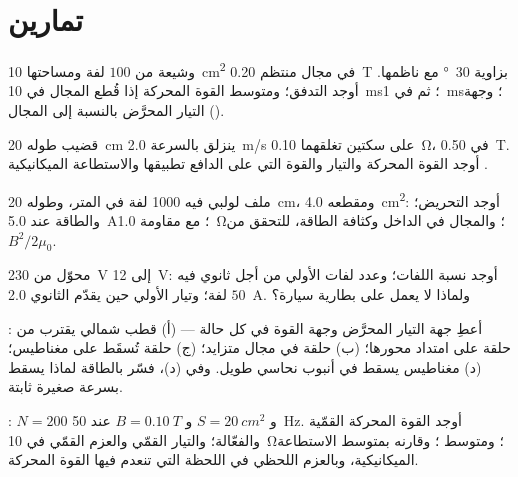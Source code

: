 \section{تمارين}

\begin{exercise}[$\star$]\label{exo:b1:induction:1}
وشيعة من $100$ لفة ومساحتها \qty{10}{cm^2} في مجال منتظم \qty{0.20}{T} بزاوية
\qty{30}{\degree} مع ناظمها. أوجد التدفق؛ ومتوسط القوة المحركة إذا قُطع المجال
في \qty{10}{ms}؛ ثم في \qty{1}{ms}؛ وجهة التيار المحرَّض
بالنسبة إلى المجال ().
\end{exercise}

\begin{exercise}[$\star$]\label{exo:b1:induction:2}
قضيب طوله \qty{20}{cm} ينزلق بالسرعة \qty{2.0}{m/s} على سكتين تغلقهما
\qty{0.10}{\ohm}، في \qty{0.50}{T}. أوجد القوة المحركة والتيار  والقوة
التي على الدافع تطبيقها والاستطاعة الميكانيكية .
\end{exercise}

\begin{exercise}[$\star$]\label{exo:b1:induction:3}
ملف لولبي فيه 1000 لفة في المتر، وطوله \qty{20}{cm}، ومقطعه \qty{4.0}{cm^2}:
أوجد التحريض؛ والطاقة عند \qty{5.0}{A}؛  مع مقاومة \qty{1.0}{\ohm}؛
والمجال في الداخل وكثافة الطاقة، للتحقق من $B^2/2\mu_0$.
\end{exercise}

\begin{exercise}[$\star$]\label{exo:b1:induction:4}
محوّل من \qty{230}{V} إلى \qty{12}{V}: أوجد نسبة اللفات؛ وعدد لفات الأولي
من أجل ثانوي فيه $50$ لفة؛ وتيار الأولي حين يقدّم الثانوي
\qty{2.0}{A}. ولماذا لا يعمل على بطارية سيارة؟
\end{exercise}

\begin{exercise}[$\star\star$]\label{exo:b1:induction:5}
: أعطِ جهة التيار المحرَّض وجهة
القوة في كل حالة --- (أ) قطب شمالي يقترب من حلقة على امتداد
محورها؛ (ب) حلقة في مجال متزايد؛ (ج) حلقة تُسقَط
على مغناطيس؛ (د) مغناطيس يسقط في أنبوب نحاسي طويل. وفي (د)،
فسّر بالطاقة لماذا يسقط بسرعة صغيرة ثابتة.
\end{exercise}

\begin{exercise}[$\star\star$]\label{exo:b1:induction:6}
: $N = 200$ و $S = \qty{20}{cm^2}$ و $B = \qty{0.10}{T}$ عند \qty{50}{Hz}.
أوجد القوة المحركة القمّية والفعّالة؛ والتيار القمّي والعزم القمّي في \qty{10}{\ohm}؛ ومتوسط
؛ وقارنه بمتوسط الاستطاعة الميكانيكية، وبالعزم
اللحظي في اللحظة التي تنعدم فيها القوة المحركة.
\end{exercise}

